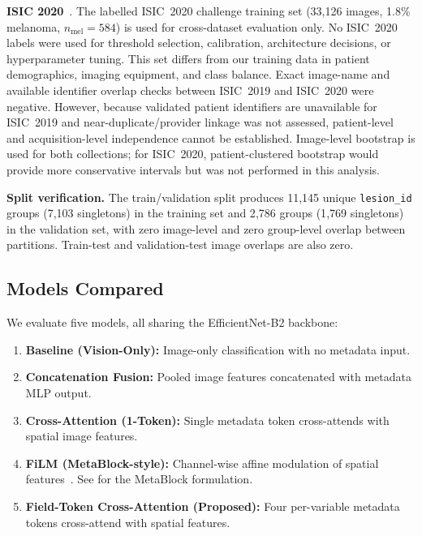 \documentclass[12pt, a4paper]{article}
\begin{document}
\textbf{ISIC 2020}~\citep{rotemberg2021patient}. The labelled ISIC~2020 challenge training set (33{,}126 images, 1.8\% melanoma, $n_{\text{mel}} = 584$) is used for cross-dataset evaluation only. No ISIC~2020 labels were used for threshold selection, calibration, architecture decisions, or hyperparameter tuning. This set differs from our training data in patient demographics, imaging equipment, and class balance. Exact image-name and available identifier overlap checks between ISIC~2019 and ISIC~2020 were negative. However, because validated patient identifiers are unavailable for ISIC~2019 and near-duplicate/provider linkage was not assessed, patient-level and acquisition-level independence cannot be established. Image-level bootstrap is used for both collections; for ISIC~2020, patient-clustered bootstrap would provide more conservative intervals but was not performed in this analysis.

\noindent\textbf{Split verification.} The train/validation split produces 11{,}145 unique \texttt{lesion\_id} groups (7{,}103 singletons) in the training set and 2{,}786 groups (1{,}769 singletons) in the validation set, with zero image-level and zero group-level overlap between partitions. Train-test and validation-test image overlaps are also zero.

\subsection{Models Compared}

We evaluate five models, all sharing the EfficientNet-B2 backbone:

\begin{enumerate}
    \item \textbf{Baseline (Vision-Only):} Image-only classification with no metadata input.
    \item \textbf{Concatenation Fusion:} Pooled image features concatenated with metadata MLP output.
    \item \textbf{Cross-Attention (1-Token):} Single metadata token cross-attends with spatial image features.
    \item \textbf{FiLM (MetaBlock-style):} Channel-wise affine modulation of spatial features~\citep{perez2018film, pacheco2021metablock}. See \citet{pacheco2021metablock} for the MetaBlock formulation.
    \item \textbf{Field-Token Cross-Attention (Proposed):} Four per-variable metadata tokens cross-attend with spatial features.
\end{enumerate}
\end{document}
